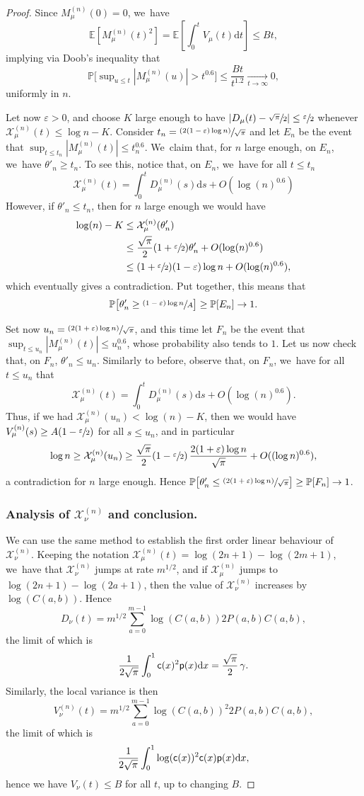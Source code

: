 \documentclass[11pt]{article}
\newcommand{\psfrac}[2]{\sfrac{(#1)}{#2}}
\newcommand{\Xmun}{\mathcal{X}^{(n)}_{\mu}}
\newcommand{\Xnun}{\mathcal{X}^{(n)}_{\nu}}
\newcommand{\pp}{\mathsf{p}}
\newcommand{\E}{\mathbb{E}}
\newcommand{\pr}{\mathbb{P}}
\let\veps\varepsilon
\newcommand{\dd}{\mathrm{d}}
\theoremstyle{definition}
\begin{document}
\begin{proof}
Since $M^{(n)}_{\mu}(0)=0$, we~have
\[
\E[M^{(n)}_{\mu}(t)^2]=\E\left[\int_{0}^t V_{\mu}(t)\mathrm d t\right]\leq Bt,
\]
implying via Doob's inequality that
\[
\pr\bigl[\sup \nolimits_{u\leq t} |M^{(n)}_{\mu}(u)|>t^{0.6}\bigr]\leq \frac{Bt}{t^{1.2}} \xrightarrow[\textstyle t\to\infty]{} 0,
\]
uniformly in $n$.

Let now $\veps>0$, and choose $K$ large enough to have $|D_{\mu}(t)-\sfrac{\sqrt{\pi}}{2}|\leq \sfrac{\veps}{2}$ whenever $\Xmun(t)\leq \log n - K$. Consider $t_n=\psfrac{2(1-\veps)\log n}{\sqrt{\pi}}$ and let $E_n$ be the event that $\sup_{t\leq t_n}|M^{(n)}_{\mu}(t) |\leq t_n^{0.6}$. We~claim that, for $n$ large enough, on $E_n$, we~have $\theta'_n\geq t_n$. To see this, notice that, on $E_n$, we~have for all $t\leq t_n$
\[
\Xmun(t)=\int_0^t D^{(n)}_{\mu}(s)\mathrm ds + O(\log(n)^{0.6})
\]
However, if $\theta'_n\leq t_n$, then for $n$ large enough we would have
\begin{align*}
\log(n)-K &\leq \Xmun(\theta'_n)\\
&\leq \frac{\sqrt{\pi}}{2}(1+\sfrac{\veps}{2})\theta'_n +O(\log(n)^{0.6}) \\
&\leq (1+\sfrac{\veps}{2})(1-\veps)\log n +O(\log(n)^{0.6}),
\end{align*}
which eventually gives a contradiction. Put together, this means that
\[
\pr\bigl[\theta'_n\geq \sfrac{(1-\veps)\log n}{A}\bigr]\geq \pr[E_n] \to 1.
\]

Set now $u_n=\psfrac{2(1+\veps)\log n}{\sqrt{\pi}}$, and this time let $F_n$ be the event that $\sup_{t\leq u_n}| M^{(n)}_{\mu}(t)| \leq u_n^{0.6}$, whose probability also tends to $1$. Let us now check that, on $F_n$, $\theta'_n\leq u_n$. Similarly to before, observe that, on $F_n$, we~have for all $t\leq u_n$ that
\[
\Xmun(t)=\int_0^t D^{(n)}_{\mu}(s)\mathrm ds + O(\log(n)^{0.6}).
\]
Thus, if we had $\Xmun(u_n)< \log(n)-K$,
then we would have $V^{(n)}_{\mu}(s)\geq A(1-\sfrac{\veps}{2})$ for all $s\leq u_n$, and in particular
\[
\log n \geq \Xmun(u_n)\geq \frac{\sqrt{\pi}}{2}(1-\sfrac{\veps}{2})\,\frac{2(1+\veps)\log n}{\sqrt{\pi}}+ O((\log n)^{0.6}),
\]
a contradiction for $n$ large enough. Hence $\pr\bigl[\theta'_n\leq \psfrac{2(1+\veps)\log n}{\sqrt{\pi}}\bigr]\geq \pr[F_n]\to 1$.

\subsubsection*{Analysis of $\Xnun$ and conclusion.}
We can use the same method to establish the first order linear behaviour of $\Xnun$. Keeping the notation $\Xmun(t)=\log (2n+1) - \log (2m+1)$, we~have that $\Xnun$ jumps at rate $m^{1/2}$, and if $\Xmun$ jumps to $\log (2n+1) - \log (2a+1)$, then the value of $\Xnun$ increases by $\log(C(a,b))$. Hence
\[
D_{\nu}(t)=m^{1/2}\sum_{a=0}^{m-1} \log (C(a,b)) 2P(a,b)C(a,b),
\]
the limit of which is
\[
\frac1{2\sqrt{\pi}}\int_{0}^1 \ff(x)^2\pp(x)\dd x=\frac{\sqrt{\pi}}{2}\,\gamma.
\]
Similarly, the local variance is then
\[
V_{\nu}^{(n)}(t)=m^{1/2}\sum_{a=0}^{m-1} \log(C(a,b))^2 2P(a,b)C(a,b),
\]
the limit of which is
\[
\frac1{2\sqrt{\pi}}\int_{0}^1 \log(\ff(x))^2\ff(x)\pp(x)\dd x,
\]
hence we have $V_{\nu}(t)\leq B$ for all $t$, up to changing $B$.


\end{proof}
\end{document}
